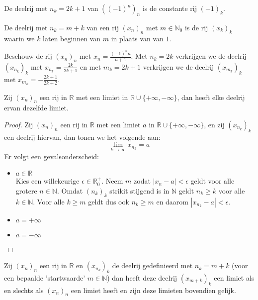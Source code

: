 \documentclass[main.tex]{subfiles}
\begin{document}
\begin{vb}
  De deelrij met $n_{k}=2k+1$ van $\left((-1)^{n}\right)_{n}$ is de constante rij $(-1)_{k}$.
\end{vb}

\begin{vb}
  De deelrij met $n_{k}=m+k$ van een rij $(x_{n})_{n}$ met $m\in \mathbb{N}_{0}$ is de rij $(x_{k})_{k}$ waarin we $k$ laten beginnen van $m$ in plaats van van $1$.
\end{vb}

\begin{vb}
  Beschouw de rij $(x_{n})_{n}$ met $x_{n} = \frac{(-1)^{n}n}{n+1}$.
  Met $n_{k} = 2k$ verkrijgen we de deelrij $(x_{n_{k}})_{k}$ met $x_{n_{k}} = \frac{2k}{2k+1}$ en met $m_{k} = 2k+1$ verkrijgen we de deelrij $(x_{m_{k}})_{k}$ met $x_{m_{k}} = -\frac{2k+1}{2k+2}$.
\end{vb}

\begin{bpr}
  \label{pr:deelrij-zelfde-limiet-als-limiet-bestaat}
  Zij $(x_{n})_{n}$ een rij in $\mathbb{R}$ met een limiet in $\mathbb{R}\cup\{+\infty,-\infty\}$, dan heeft elke deelrij ervan dezelfde limiet.

  \begin{proof}
    Zij $(x_{n})_{n}$ een rij in $\mathbb{R}$ met een limiet $a$ in $\mathbb{R}\cup\{+\infty,-\infty\}$, en zij $(x_{n_{k}})_{k}$ een deelrij hiervan, dan tonen we het volgende aan:
    \[ \lim_{k\rightarrow \infty}x_{n_{k}} = a \]
    Er volgt een gevalsonderscheid:
    \begin{itemize}
    \item $a\in \mathbb{R}$\\
      Kies een willekeurige $\epsilon \in \mathbb{R}_{0}^{+}$.
      Neem $m$ zodat $|x_{n}-a| < \epsilon$ geldt voor alle grotere $n\in \mathbb{N}$.
      Omdat $(n_{k})_{k}$ strikit stijgend is in $\mathbb{N}$ geldt $n_{k} \ge k$ voor alle $k\in \mathbb{N}$.
      Voor alle $k \ge m$ geldt dus ook $n_{k} \ge m$ en daarom $|x_{n_{k}}-a| < \epsilon$.
    \item $a = +\infty$
    \item $a = -\infty$
    \end{itemize}
  \end{proof}
\end{bpr}

\begin{pr}
  Zij $(x_{n})_{n}$ een rij in $\mathbb{R}$ en $(x_{n_{k}})_{k}$ de deelrij gedefinieerd met $n_{k} = m+k$ (voor een bepaalde 'startwaarde' $m\in\mathbb{N}$) dan heeft deze deelrij $(x_{m+k})_{k}$ een limiet als en slechts als $(x_{n})_{n}$ een limiet heeft en zijn deze limieten bovendien gelijk.
\end{pr}
\end{document}
